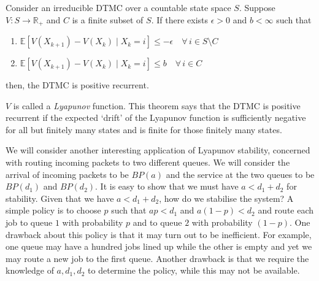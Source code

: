 \documentclass[12pt]{article}
\theoremstyle{definition}
\begin{document}
    \begin{thm}
        Consider an irreducible DTMC over a countable state space $S$. Suppose $V \colon S \to \mathbb{R}_+$ and $C$ is a finite subset of $S$. If there exists $\epsilon > 0$ and $b < \infty$ such that
        \begin{enumerate}
            \item $\mathbb{E} \left[ V(X_{k+1}) - V(X_k) \mid X_k = i \right] \leq -\epsilon \quad \forall \, i \in S \setminus C$
            \item $\mathbb{E} \left[ V(X_{k+1}) - V(X_k) \mid X_k = i \right] \leq b \quad \forall \, i \in C$
        \end{enumerate}
        then, the DTMC is positive recurrent.
    \end{thm}
    
    $V$ is called a \emph{Lyapunov} function. This theorem says that the DTMC is positive recurrent if the expected `drift' of the Lyapunov function is sufficiently negative for all but finitely many states and is finite for those finitely many states.
    
    \medskip
    
    We will consider another interesting application of Lyapunov stability, concerned with routing incoming packets to two different queues. We will consider the arrival of incoming packets to be $BP(a)$ and the service at the two queues to be $BP(d_1)$ and $BP(d_2)$. It is easy to show that we must have $a < d_1 + d_2$ for stability. Given that we have $a < d_1 + d_2$, how do we stabilise the system? A simple policy is to choose $p$ such that $ap < d_1$ and $a(1-p) < d_2$ and route each job to queue $1$ with probability $p$ and to queue $2$ with probability $(1-p)$.  One drawback about this policy is that it may turn out to be inefficient. For example, one queue may have a hundred jobs lined up while the other is empty and yet we may route a new job to the first queue. Another drawback is that we require the knowledge of $a, d_1, d_2$ to determine the policy, while this may not be available.
    
    \medskip
    
\end{document}
